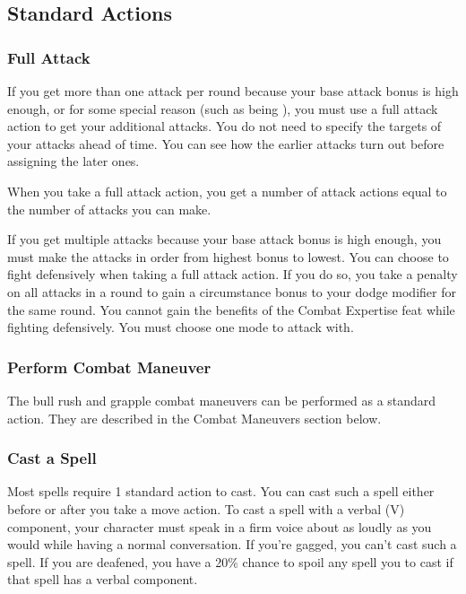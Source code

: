 \subsection{Standard Actions}

\subsubsection{Full Attack}
If you get more than one attack per round because your base attack bonus is high enough, or for some special reason (such as being ), you must use a full attack action to get your additional attacks. You do not need to specify the targets of your attacks ahead of time. You can see how the earlier attacks turn out before assigning the later ones.
\par When you take a full attack action, you get a number of attack actions equal to the number of attacks you can make.
\par If you get multiple attacks because your base attack bonus is high enough, you must make the attacks in order from highest bonus to lowest.
 You can choose to fight defensively when taking a full attack action. If you do so, you take a  penalty on all attacks in a round to gain a  circumstance bonus to your dodge modifier for the same round. You cannot gain the benefits of the Combat Expertise feat while fighting defensively. You must choose one mode to attack with.

\subsubsection{Perform Combat Maneuver}
The bull rush and grapple combat maneuvers can be performed as a standard action. They are described in the Combat Maneuvers section below.

\subsubsection{Cast a Spell}
Most spells require 1 standard action to cast. You can cast such a spell either before or after you take a move action.
 To cast a spell with a verbal (V) component,
your character must speak in a firm voice about as loudly as you would while having a normal conversation. If you're gagged, you can't cast such a spell. If you are deafened, you have a 20\% chance to spoil any spell you to cast if that spell has a verbal component.

